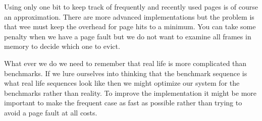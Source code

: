 \documentclass[a4paper,11pt]{article}
\begin{document}
Using only one bit to keep track of frequently and recently used pages
is of course an approximation. There are more advanced implementations
but the problem is that wee must keep the overhead for page hits to a
minimum. You can take some penalty when we have a page fault but we
do not want to examine all frames in memory to decide which one to
evict. 

What ever we do we need to remember that real life is more complicated
than benchmarks. If we lure ourselves into thinking that the benchmark
sequence is what real life sequences look like then we might optimize
our system for the benchmarks rather than reality. To improve the
implementation it might be more important to make the frequent case as
fast as possible rather than trying to avoid a page fault at all costs. 
\end{document}
